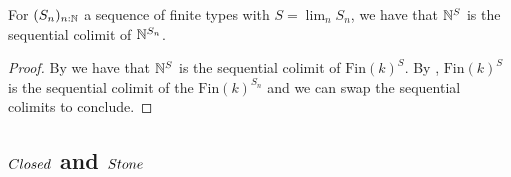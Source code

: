 \begin{corollary}\label{scott-continuity}
  For $(S_n)_{n:\mathbb{N}}$ a sequence of finite types with $S=\lim_nS_n$, we have that $\mathbb{N}^S$ is the sequential colimit of $\mathbb{N}^{S_n}$. 
\end{corollary}
\begin{proof}
  By  we have that $\mathbb{N}^S$ is the sequential colimit of $\mathrm{Fin}(k)^S$. 
  By , $\mathrm{Fin}(k)^S$ is the sequential colimit of the $\mathrm{Fin}(k)^{S_n}$ and we can swap the sequential colimits to conclude.
  \end{proof} 



\subsection{$\Closed$ and $\Stone$}


